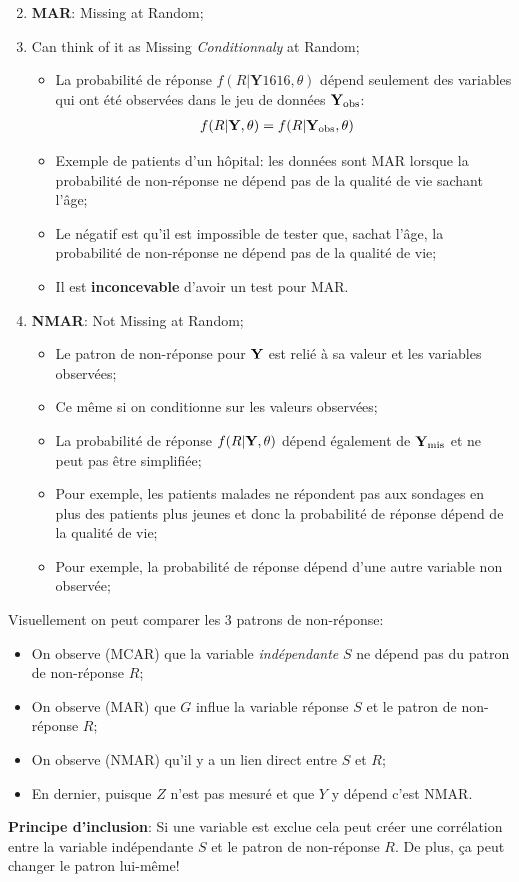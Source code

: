 \documentclass[10pt, french]{article}
\begin{document}
\begin{multicols*}{3}
\begin{enumerate}
\end{enumerate}
\begin{enumerate}
	\setcounter{enumi}{1}
	\item	\textbf{MAR}: Missing at Random;
	\item[]	Can think of it as Missing \textit{Conditionnaly} at Random;
		\begin{itemize}[leftmargin = *]
		\item	La probabilité de réponse $f(R | \bm{Y}1616, \theta)$ dépend seulement des variables qui ont été observées dans le jeu de données $\mathbf{Y}_{\text{obs}}$:
			\begin{align*}
			f(R | \mathbf{Y}, \theta) &= f(R | \mathbf{Y}_{\text{obs}}, \theta) 
			\end{align*}
		\item	Exemple de patients d'un hôpital: les données sont MAR lorsque la probabilité de non-réponse ne dépend pas de la qualité de vie sachant l'âge;
		\item	Le négatif est qu'il est impossible de tester que, sachat l'âge, la probabilité de non-réponse ne dépend pas de la qualité de vie;
		\item	Il est \textbf{inconcevable} d'avoir un test pour MAR.
		\end{itemize}
	\item	\textbf{NMAR}: Not Missing at Random;
		\begin{itemize}[leftmargin = *]
		\item	Le patron de non-réponse pour $\mathbf{Y}$ est relié à sa valeur et les variables observées;
		\item[]	Ce même si on conditionne sur les valeurs observées;
		\item	La probabilité de réponse $f(R | \mathbf{Y}, \theta)$ dépend également de $\mathbf{Y}_{\text{mis}}$ et ne peut pas être simplifiée;
		\item	Pour exemple, les patients malades ne répondent pas aux sondages en plus des patients plus jeunes et donc la probabilité de réponse dépend de la qualité de vie;
		\item	Pour exemple, la probabilité de réponse dépend d'une autre variable non observée;
		\end{itemize}
\end{enumerate}

Visuellement on peut comparer les 3 patrons de non-réponse:
\begin{itemize}
	\item	On observe (MCAR) que la variable \textit{indépendante} $S$ ne dépend pas du patron de non-réponse $R$;
	\item	On observe (MAR) que $G$ influe la variable réponse $S$ et le patron de non-réponse $R$;
	\item	On observe (NMAR) qu'il y a un lien direct entre $S$ et $R$;
	\item	En dernier, puisque $Z$ n'est pas mesuré et que $Y$ y dépend c'est NMAR.
\end{itemize}
\textbf{Principe d'inclusion}: Si une variable est exclue cela peut créer une corrélation entre la variable indépendante $S$ et le patron de non-réponse $R$. De plus, ça peut changer le patron lui-même!


\end{multicols*}
\end{document}
